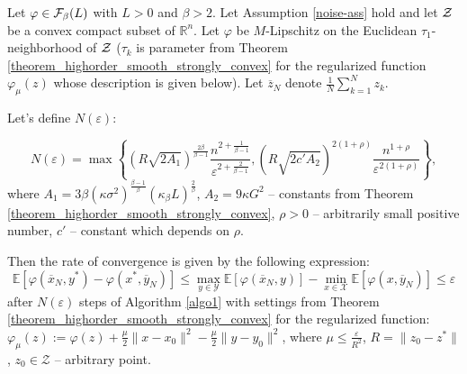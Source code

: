 \documentclass[runningheads]{llncs}
\def \R {\mathbb R}
\def\R{\mathbb{R}}
\newcommand{\E}{{\mathbb E}}
\def\R{\mathbb R}
\def\E{\mathbb E}
\def\la{\langle}
\def\ra{\rangle}
\begin{document}
\begin{theorem} \label{theorem_highorder_smooth}

Let $\varphi \in {\cal F}_{\beta}(L)$ with $L > 0$ and $\beta > 2$. 
Let Assumption \ref{noise-ass} hold 
and let $\cal{Z}$ be a convex compact subset of $\R^n$.
Let $\varphi$ be $M$-Lipschitz on the Euclidean $\tau_1$-neighborhood of $\cal{Z}$ ($\tau_k$ is parameter from Theorem \ref{theorem_highorder_smooth_strongly_convex} for the regularized function $\varphi_\mu(z)$ whose  description is given below). Let $\overline{z}_N$ denote $\frac{1}{N}\sum\limits_{k=1}^N z_k$.

Let's define $N(\varepsilon)$:

\begin{equation*}
    N(\varepsilon)=\max\left\{ \left(R\sqrt{2A_1}\right)^{\frac{2\beta}{\beta-1}}\dfrac{n^{2+\frac{1}{\beta-1}}}{\varepsilon^{2+\frac{2}{\beta-1}}},\left(R\sqrt{2c'A_2}\right)^{2(1+\rho)}\dfrac{n^{1+\rho}}{\varepsilon^{2(1+\rho)}}\right\},
\end{equation*}
where  $A_1=3\beta(\kappa \sigma^2)^{\frac{\beta-1}{\beta}}(\kappa_{\beta}L)^{\frac{2}{\beta}}$, $A_2=9\kappa G^2$ -- constants from Theorem \ref{theorem_highorder_smooth_strongly_convex}, $\rho > 0$ -- arbitrarily small positive number, $c'$ -- constant which depends on $\rho$. 

Then the rate of convergence is given by the following expression:
\begin{equation}
    \E \left[ \varphi(\overline{x}_N, y^*) - \varphi(x^*, \overline{y}_N) \right] \leq \max_{y\in \mathcal{Y}} \E \left[\varphi(\overline{x}_N, y)  \right] -
    \min_{x\in \mathcal{X}}\E \left[\varphi(x, \overline{y}_N) \right] \leq \varepsilon
\end{equation}
after $N(\varepsilon)$ steps of Algorithm \ref{algo1} with settings from Theorem \ref{theorem_highorder_smooth_strongly_convex} for the regularized function: $\varphi_{\mu}(z):=\varphi(z)+\frac{\mu}{2} \| x-x_0 \|^2-\frac{\mu}{2} \| y - y_0 \|^2$, where $\mu \leq \frac{\varepsilon}{R^2}$, $R=\|z_0-z^*\|$, $z_0 \in \mathcal{Z}$ -- arbitrary point.

\end{theorem}

\end{document}
